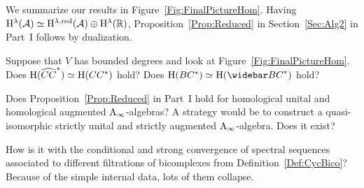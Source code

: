 \documentclass[\MainFolder/Text.tex]{subfiles}
\begin{document}
We summarize our results in Figure~\ref{Fig:FinalPictureHom}. Having $\mathrm{H}^\lambda(\mathcal{A}) \simeq \mathrm{H}^{\lambda,\mathrm{red}}(\mathcal{A}) \oplus \mathrm{H}^{\lambda}(\mathbb{R})$, Proposition~\ref{Prop:Reduced} in Section~\ref{Sec:Alg2} in Part~I follows by dualization. 

\begin{Remark}\label{Rem:OpenProbAInftx}
\begin{RemarkList}
\item Suppose that $V$ has bounded degrees and look at Figure~\ref{Fig:FinalPictureHom}. Does $\mathrm{H}(\widehat{CC}^*)\simeq \mathrm{H}(CC^*)$ hold? Does $\H(\ConCycBi^*)\simeq\H(\NConCycBi^*)$ hold?
\item Does Proposition~\ref{Prop:Reduced} in Part~I hold for homological unital and homological augmented $\mathrm{A}_\infty$-algebras? A strategy would be to construct a quasi-isomorphic strictly unital and strictly augmented $\mathrm{A}_\infty$-algebra. Does it exist?
\item How is it with the conditional and strong convergence of spectral sequences associated to different filtrations of bicomplexes from Definition~\ref{Def:CycBico}? Because of the simple internal data, lots of them collapse.\qedhere
\end{RemarkList}
\end{Remark}
\end{document}
